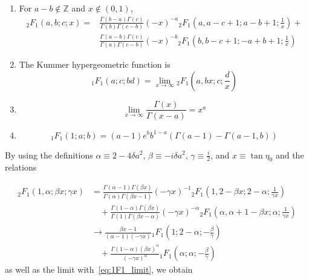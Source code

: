 \documentclass[preprint,notitlepage,amsmath,amssymb,floatfix]{revtex4-1}
\begin{document}
\begin{enumerate}
  \item For $a - b\notin \mathbb{Z}$ and $x\notin\left(0, 1\right)$,
  \begin{equation}
    \label{eq:2F1transform}
    \begin{split}
    {}_2F_1\left(a,b;c;x\right) =& \frac{\Gamma\left(b-a\right)\Gamma\left(c\right)}{\Gamma\left(b\right)\Gamma\left(c-b\right)}\left(-x\right)^{-a} {}_2F_1\left(a,a-c+1;a-b+1;\frac{1}{x}\right) + \\
    & \frac{\Gamma\left(a-b\right)\Gamma\left(c\right)}{\Gamma\left(a\right)\Gamma\left(c-b\right)}\left(-x\right)^{-b} {}_2F_1\left(b,b-c+1;-a+b+1;\frac{1}{x}\right)
    \end{split}
  \end{equation}

  \item The Kummer hypergeometric function is
  \begin{equation}
  {}_1F_1\left(a;c;bd\right) = \lim_{x\to\infty} {}_2F_1\left(a,bx;c;\frac{d}{x}\right)
  \end{equation}

  \item
  \begin{equation}
  \lim_{x\to\infty}\frac{\Gamma\left(x\right)}{\Gamma\left(x-a\right)} = x^a
  \end{equation}

  \item
  \begin{equation}
  \label{eq:1F1_limit}
  {}_1F_1\left(1;a;b\right) = \left(a-1\right)e^{b}b^{1-a}\left(\Gamma\left(a-1\right)-\Gamma\left(a-1,b\right)\right)
  \end{equation}
\end{enumerate}

\noindent By using the definitions $\alpha\equiv 2-4\delta a^2$, $\beta\equiv -i\delta a^2$, $\gamma\equiv\frac{i}{2}$, and $x\equiv\tan\eta_0$ and the relations

\begin{equation}
\begin{split}
{}_2F_1\left(1,\alpha;\beta x;\gamma x\right) &= \frac{\Gamma\left(\alpha-1\right)\Gamma\left(\beta x\right)}{\Gamma\left(\alpha\right)\Gamma\left(\beta x-1\right)}\left(-\gamma x\right)^{-1} {}_2F_1\left(1,2-\beta x;2-\alpha;\frac{1}{\gamma x}\right) \\
&\quad + \frac{\Gamma\left(1-\alpha\right)\Gamma\left(\beta x\right)}{\Gamma\left(1\right)\Gamma\left(\beta x-\alpha\right)}\left(-\gamma x\right)^{-\alpha} {}_2F_1\left(\alpha,\alpha+1-\beta x;\alpha;\frac{1}{\gamma x}\right) \\
&\rightarrow \frac{\beta x-1}{\left(\alpha-1\right)\left(-\gamma x\right)} {}_1F_1\left(1;2-\alpha;-\frac{\beta}{\gamma}\right) \\
&\quad + \frac{\Gamma\left(1-\alpha\right)\left(\beta x\right)^\alpha}{\left(-\gamma x\right)^\alpha} {}_1F_1\left(\alpha;\alpha;-\frac{\beta}{\gamma}\right)
\end{split}
\end{equation}
\noindent as well as the limit with~\eqref{eq:1F1_limit}, we obtain
\end{document}
